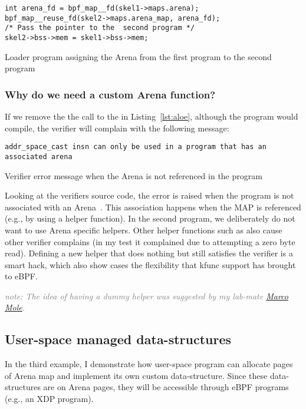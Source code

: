 \documentclass{article}
\begin{document}
\begin{listing}
\begin{verbatim}
int arena_fd = bpf_map__fd(skel1->maps.arena);
bpf_map__reuse_fd(skel2->maps.arena_map, arena_fd);
/* Pass the pointer to the  second program */
skel2->bss->mem = skel1->bss->mem;
\end{verbatim}
\caption{Loader program assigning the Arena from the first program to the second program}
\label{lst:share-map-ref}
\end{listing}

\subsubsection{Why do we need a custom Arena function?}
\label{sec:need_custom}
If we remove the the call to the  in
Listing~\ref{lst:aloe}, although the program would compile, the verifier will
complain with the following message:

\begin{listing}
\begin{verbatim}
addr_space_cast insn can only be used in a program that has an associated arena
\end{verbatim}
\caption{Verifier error message when the Arena is not referenced in the program}
\label{lst:verifier_err_msg}
\end{listing}

Looking at the verifiers source code, the error is raised when the program
is not associated with an Arena~\cite{verifier_arena_not_set}. This association
happens when the MAP is referenced (e.g., by using a helper function).
In the second program, we deliberately do not want to use Arena specific
helpers. Other helper functions such as  also cause
other verifier complains (in my test it complained due to attempting a zero
byte read). Defining a new helper that does nothing but still satisfies the
verifier is a smart hack, which also show cases the flexibility that kfunc
support has brought to eBPF.

\textcolor{gray}{\textit{note: The idea of having a dummy helper was suggested
by my lab-mate \href{https://github.com/marcomole00/}{Marco Mole}.}}


\subsection{User-space managed data-structures}

In the third example, I demonstrate how user-space program can allocate pages of
Arena map and implement its own custom data-structure. Since these
data-structures are on Arena pages, they will be accessible through eBPF
programs (e.g., an XDP program).
\end{document}
